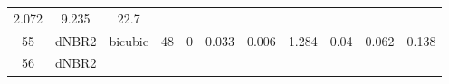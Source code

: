 \documentclass[twoside,12pt,final]{ucthesis-CA2012}
\begin{document}
\begin{ucmainmatter}
\begin{longtable}[]{@{}ccccccccccc@{}}
\begin{minipage}[t]{0.05\columnwidth}
2.072\strut
\end{minipage} & \begin{minipage}[t]{0.05\columnwidth}\centering\strut
9.235\strut
\end{minipage} & \begin{minipage}[t]{0.05\columnwidth}\centering\strut
22.7\strut
\end{minipage}\tabularnewline
\begin{minipage}[t]{0.04\columnwidth}\centering\strut
55\strut
\end{minipage} & \begin{minipage}[t]{0.11\columnwidth}\centering\strut
dNBR2\strut
\end{minipage} & \begin{minipage}[t]{0.06\columnwidth}\centering\strut
bicubic\strut
\end{minipage} & \begin{minipage}[t]{0.08\columnwidth}\centering\strut
48\strut
\end{minipage} & \begin{minipage}[t]{0.08\columnwidth}\centering\strut
0\strut
\end{minipage} & \begin{minipage}[t]{0.07\columnwidth}\centering\strut
0.033\strut
\end{minipage} & \begin{minipage}[t]{0.07\columnwidth}\centering\strut
0.006\strut
\end{minipage} & \begin{minipage}[t]{0.07\columnwidth}\centering\strut
1.284\strut
\end{minipage} & \begin{minipage}[t]{0.05\columnwidth}\centering\strut
0.04\strut
\end{minipage} & \begin{minipage}[t]{0.05\columnwidth}\centering\strut
0.062\strut
\end{minipage} & \begin{minipage}[t]{0.05\columnwidth}\centering\strut
0.138\strut
\end{minipage}\tabularnewline
\begin{minipage}[t]{0.04\columnwidth}\centering\strut
56\strut
\end{minipage} & \begin{minipage}[t]{0.11\columnwidth}\centering\strut
dNBR2\strut
\end{minipage} & \begin{minipage}[t]{0.06\columnwidth}\centering\strut

\end{minipage}
\end{longtable}
\end{ucmainmatter}
\end{document}
